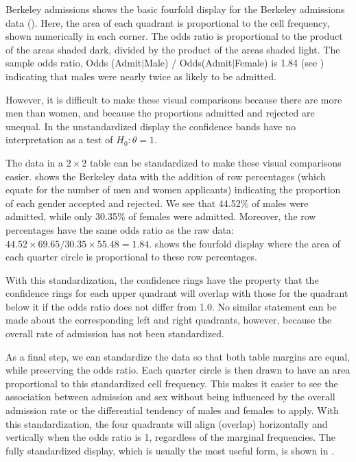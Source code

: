 \begin{Example}[berkeley2]{Berkeley admissions}
 shows the basic fourfold display for the
Berkeley admissions data ().
Here, the area of each quadrant is proportional to the cell frequency,
shown numerically in each corner.
The odds ratio is proportional to the product of the areas
shaded dark, divided by the product of the areas shaded light.
The sample odds ratio, Odds (Admit\(|\)Male) / Odds(Admit\(|\)Female) is
1.84 (see )
indicating that males were nearly twice as likely to be admitted.

However, it is difficult to make these visual comparisons
because there are more men than women, and because the
proportions admitted and rejected are unequal.  In the unstandardized
display the confidence bands have no interpretation as a test
of \(H_0 :  \theta  =  1\).


The data in a $2 \times 2$ table can be standardized to make these
visual comparisons easier.
 shows the Berkeley data with the addition of
row percentages (which equate for the number of men and women applicants)
 indicating the proportion of each gender accepted
and rejected.
We see that 44.52\% of males were admitted, while only 30.35\% of
females were admitted.
Moreover, the row percentages have the same odds ratio as the
raw data: $44.52 \times 69.65 / 30.35 \times 55.48 = 1.84$.
 shows the fourfold display where
the area of each quarter circle is proportional to these row
percentages.

With this standardization, the confidence rings have the property
that the confidence rings for each upper quadrant will overlap
with those for the quadrant below it if the
odds ratio does not differ from 1.0.
No similar statement can be made about the
corresponding left and right quadrants, however, because
the overall rate of admission has not been standardized.



As a final step, we can standardize the data so that both table margins
are equal, while preserving the odds ratio.
Each quarter circle is then drawn to have an area
proportional to this standardized cell frequency.  This makes it
easier to see the association between admission and sex without being
influenced by the overall admission rate or the differential tendency
of males and females to apply.  With this standardization, the four
quadrants will align (overlap) horizontally and vertically
when the odds ratio is 1, regardless of the
marginal frequencies.  The fully standardized display, which is
usually the most useful form, is shown in .


\end{Example}
